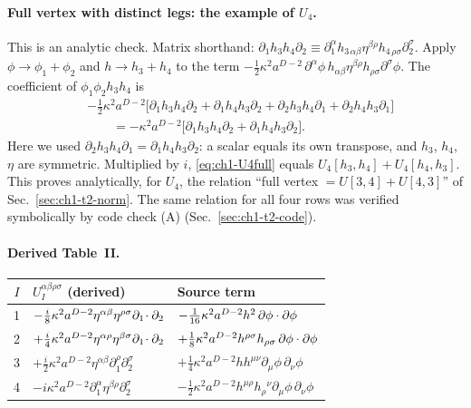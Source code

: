 \paragraph{Full vertex with distinct legs: the example of $U_4$.} This is an
analytic check. Matrix shorthand:
$\partial_1h_3h_4\partial_2\equiv\partial_1^\alpha h_{3\,\alpha\beta}\eta^{\beta\rho}h_{4\,\rho\sigma}\partial_2^\sigma$.
Apply $\phi\to\phi_1+\phi_2$ and $h\to h_3+h_4$ to the term
$-\tfrac12\kappa^2a^{D-2}\,\partial^\alpha\phi\,h_{\alpha\beta}\eta^{\beta\rho}h_{\rho\sigma}\partial^\sigma\phi$.
The coefficient of $\phi_1\phi_2h_3h_4$ is
\begin{equation}
\begin{aligned}
&-\tfrac12\kappa^2a^{D-2}\big[\partial_1h_3h_4\partial_2+\partial_1h_4h_3\partial_2+\partial_2h_3h_4\partial_1+\partial_2h_4h_3\partial_1\big]\\
&\qquad=-\kappa^2a^{D-2}\big[\partial_1h_3h_4\partial_2+\partial_1h_4h_3\partial_2\big].
\end{aligned}
\label{eq:ch1-U4full}
\end{equation}
Here we used $\partial_2h_3h_4\partial_1=\partial_1h_4h_3\partial_2$: a scalar
equals its own transpose, and $h_3$, $h_4$, $\eta$ are symmetric. Multiplied
by $i$, \eqref{eq:ch1-U4full} equals $U_4[h_3,h_4]+U_4[h_4,h_3]$. This proves
analytically, for $U_4$, the relation ``full vertex $=U[3,4]+U[4,3]$'' of
Sec.~\ref{sec:ch1-t2-norm}. The same relation for all four rows was verified
symbolically by code check (A) (Sec.~\ref{sec:ch1-t2-code}).

\paragraph{Derived Table~II.}
\begin{center}
\small
\begin{tabular}{cll}
\toprule
$I$ & $U_I^{\alpha\beta\rho\sigma}$ (derived) & Source term\\
\midrule
1 & $-\tfrac i8\kappa^2a^{D-2}\eta^{\alpha\beta}\eta^{\rho\sigma}\partial_1\!\cdot\partial_2$ & $-\tfrac1{16}\kappa^2a^{D-2}h^2\,\partial\phi\cdot\partial\phi$\\
2 & $+\tfrac i4\kappa^2a^{D-2}\eta^{\alpha\rho}\eta^{\beta\sigma}\partial_1\!\cdot\partial_2$ & $+\tfrac18\kappa^2a^{D-2}h^{\rho\sigma}h_{\rho\sigma}\,\partial\phi\cdot\partial\phi$\\
3 & $+\tfrac i2\kappa^2a^{D-2}\eta^{\alpha\beta}\partial_1^\rho\partial_2^\sigma$ & $+\tfrac14\kappa^2a^{D-2}hh^{\mu\nu}\partial_\mu\phi\,\partial_\nu\phi$\\
4 & $-i\kappa^2a^{D-2}\partial_1^\alpha\eta^{\beta\rho}\partial_2^\sigma$ & $-\tfrac12\kappa^2a^{D-2}h^{\mu\rho}h_\rho{}^\nu\partial_\mu\phi\,\partial_\nu\phi$\\
\bottomrule
\end{tabular}
\end{center}

